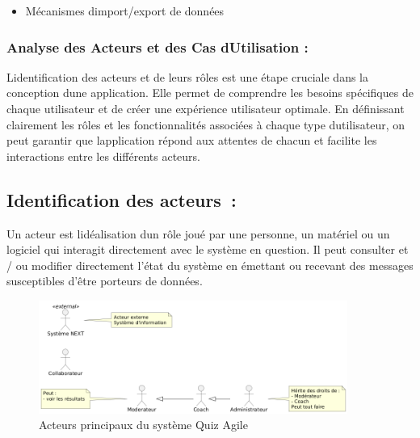 \documentclass[12pt,a4paper,twoside,openright]{report}
\begin{document}
\begin{itemize}
\item
  Mécanismes
  d\textquotesingle import/export de données
\end{itemize}

\hypertarget{analyse-des-acteurs-et-des-cas-dutilisation}{%
\subsubsection{Analyse des Acteurs et des Cas
d\textquotesingle Utilisation
:}\label{analyse-des-acteurs-et-des-cas-dutilisation}}

L\textquotesingle identification des acteurs et de leurs rôles est une
étape cruciale dans la conception d\textquotesingle une application.
Elle permet de comprendre les besoins spécifiques de chaque utilisateur
et de créer une expérience utilisateur optimale. En définissant
clairement les rôles et les fonctionnalités associées à chaque type
d\textquotesingle utilisateur, on peut garantir que
l\textquotesingle application répond aux attentes de chacun et facilite
les interactions entre les différents acteurs.

\hypertarget{identification-des-acteurs}{%
\subsection{Identification des
acteurs~:}\label{identification-des-acteurs}}

Un acteur est l\textquotesingle idéalisation d\textquotesingle un rôle
joué par une personne, un matériel ou un logiciel qui interagit
directement avec le système en question. Il peut consulter et / ou
modifier directement l'état du système en émettant ou recevant des
messages susceptibles d'être porteurs de données.

\begin{figure}[H]
\centering
\includegraphics[width=0.9\textwidth]{latex_media/media/image13.png}
\caption{Acteurs principaux du système Quiz Agile}
\label{fig:acteurs-principaux}
\end{figure}
\end{document}
